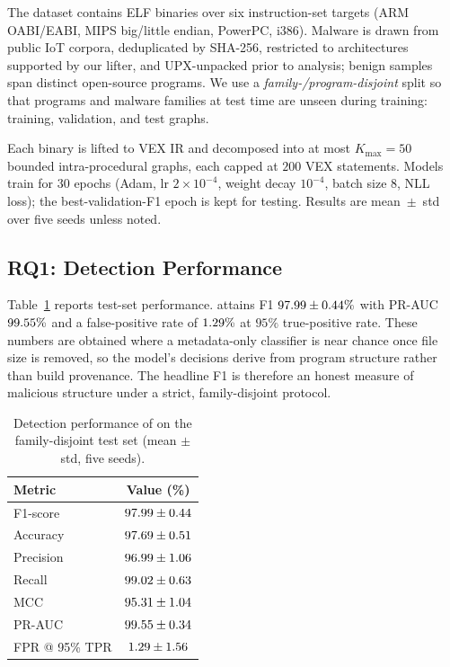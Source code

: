 \documentclass[conference]{IEEEtran}
\begin{document}
The dataset contains \dsTotal{} ELF binaries over six instruction-set
targets (ARM OABI/EABI, MIPS big/little endian, PowerPC, i386). Malware is
drawn from public IoT corpora, deduplicated by SHA-256, restricted to
architectures supported by our lifter, and UPX-unpacked prior to analysis;
benign samples span \dsBenignProg{} distinct open-source programs. We use a
\emph{family-/program-disjoint} split so that programs and malware
families at test time are unseen during training: \dsTrain{} training,
\dsVal{} validation, and \dsTest{} test graphs.

Each binary is lifted to VEX IR and decomposed into at most $K_{\max}=50$
bounded intra-procedural graphs, each capped at $200$ VEX statements.
Models train for $30$ epochs (Adam, lr $2\times10^{-4}$, weight decay
$10^{-4}$, batch size $8$, NLL loss); the best-validation-F1 epoch is kept
for testing. Results are mean~$\pm$~std over five seeds unless noted.

\subsection{RQ1: Detection Performance}
\label{sec:detection}

Table~\ref{tab:detection} reports test-set performance. 
attains F1 $97.99{}\pm0.44{}\%$ with PR-AUC $99.55{}\%$ and a
false-positive rate of $1.29{}\%$ at $95\%$ true-positive rate. These
numbers are obtained where a metadata-only classifier is near chance once
file size is removed, so the model's decisions derive from program
structure rather than build provenance. The headline F1 is therefore an
honest measure of malicious structure under a strict, family-disjoint
protocol.

\begin{table}[t]
\centering
\caption{Detection performance of  on the family-disjoint test
set (mean $\pm$ std, five seeds).}
\label{tab:detection}
\begin{tabular}{lc}
\hline
Metric & Value (\%) \\
\hline
F1-score        & $97.99 \pm 0.44$ \\
Accuracy        & $97.69 \pm 0.51$ \\
Precision       & $96.99 \pm 1.06$ \\
Recall          & $99.02 \pm 0.63$ \\
MCC             & $95.31 \pm 1.04$ \\
PR-AUC          & $99.55 \pm 0.34$ \\
FPR @ 95\% TPR  & $1.29 \pm 1.56$ \\
\hline
\end{tabular}
\end{table}
\end{document}
